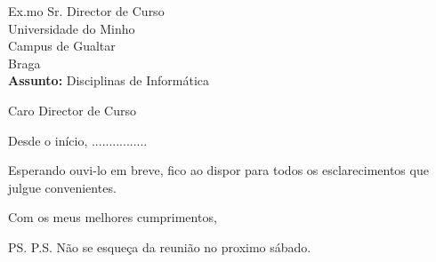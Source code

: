 \documentclass{letter} %
\date{24 Outubro de 2018}
\begin{document}

\begin{letter}{Ex.mo Sr. Director de Curso\\
               Universidade do  Minho\\ Campus de Gualtar\\ Braga\\
               \vspace{1cm}
               \textbf{Assunto:} Disciplinas de Informática
} %

\opening{Caro Director de Curso} %

Desde o início, ................

Esperando ouvi-lo em breve, fico ao dispor para todos os
esclarecimentos que julgue convenientes.

\closing{Com os meus melhores cumprimentos,} %



\ps
P.S. Não se esqueça da reunião no proximo sábado.


\end{letter}
\end{document}
